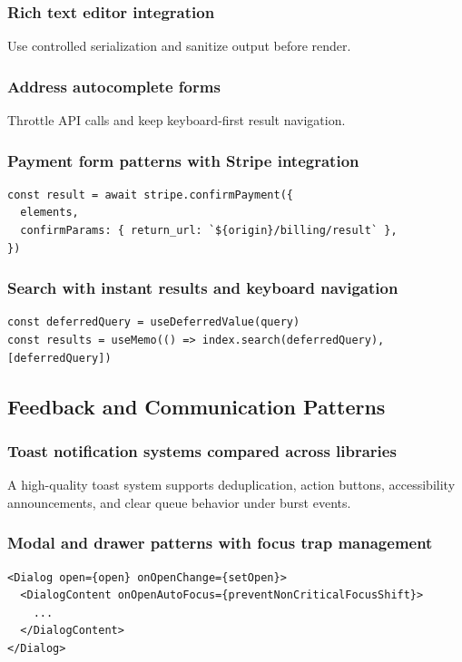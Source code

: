 \subsubsection{Rich text editor integration}
Use controlled serialization and sanitize output before render.

\subsubsection{Address autocomplete forms}
Throttle API calls and keep keyboard-first result navigation.

\subsubsection{Payment form patterns with Stripe integration}
\begin{verbatim}
const result = await stripe.confirmPayment({
  elements,
  confirmParams: { return_url: `${origin}/billing/result` },
})
\end{verbatim}

\subsubsection{Search with instant results and keyboard navigation}
\begin{verbatim}
const deferredQuery = useDeferredValue(query)
const results = useMemo(() => index.search(deferredQuery), [deferredQuery])
\end{verbatim}

\subsection{Feedback and Communication Patterns}

\subsubsection{Toast notification systems compared across libraries}
A high-quality toast system supports deduplication, action buttons, accessibility announcements, and clear queue behavior under burst events.

\subsubsection{Modal and drawer patterns with focus trap management}
\begin{verbatim}
<Dialog open={open} onOpenChange={setOpen}>
  <DialogContent onOpenAutoFocus={preventNonCriticalFocusShift}>
    ...
  </DialogContent>
</Dialog>
\end{verbatim}

